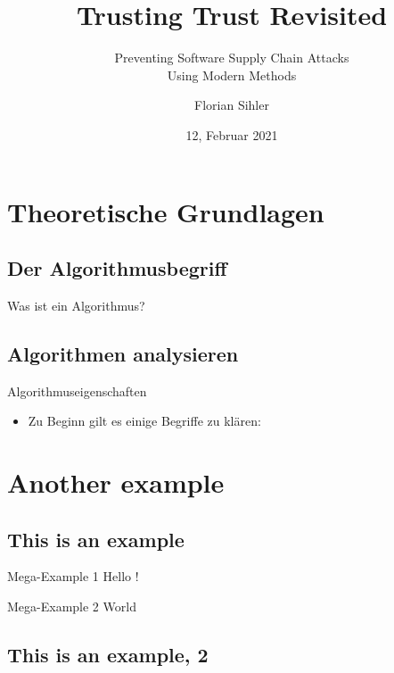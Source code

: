\documentclass[aspectratio=169,usepdftitle=true]{beamer}
\title{Trusting Trust Revisited}
\subtitle{Preventing Software Supply Chain Attacks\hfill\\Using Modern Methods}
\institute{Institute of Distributed Systems, Ulm University}
\date{12, Februar 2021}
\author{Florian Sihler}
\begin{document}
\section{Theoretische Grundlagen}
\subsection{Der Algorithmusbegriff}
\begin{frame}{Was ist ein Algorithmus?}
    \lipsum[2]
\end{frame}
\subsection{Algorithmen analysieren}
\makeatletter

\begin{frame}{Algorithmuseigenschaften}
    \begin{itemize}
        \item Zu Beginn gilt es einige Begriffe zu klären: 
    \end{itemize}
\end{frame}



\section{Another example}
\subsection{This is an example}

\begin{frame}{Mega-Example 1}
    Hello \cite{knuth-fa}!
\end{frame}

\begin{frame}{Mega-Example 2}
    World
\end{frame}

\subsection{This is an example, 2}
\end{document}
